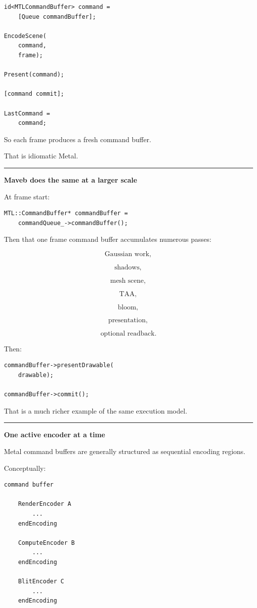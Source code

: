 \begin{verbatim}
id<MTLCommandBuffer> command =
    [Queue commandBuffer];

EncodeScene(
    command,
    frame);

Present(command);

[command commit];

LastCommand =
    command;
\end{verbatim}

So each frame produces a fresh command buffer.

That is idiomatic Metal.

\begin{center}\rule{0.5\linewidth}{0.5pt}\end{center}

\textbf{Maveb does the same at a larger scale}

At frame start:

\begin{verbatim}
MTL::CommandBuffer* commandBuffer =
    commandQueue_->commandBuffer();
\end{verbatim}

Then that one frame command buffer accumulates numerous passes:

\[
\text{Gaussian work},
\]

\[
\text{shadows},
\]

\[
\text{mesh scene},
\]

\[
\text{TAA},
\]

\[
\text{bloom},
\]

\[
\text{presentation},
\]

\[
\text{optional readback}.
\]

Then:

\begin{verbatim}
commandBuffer->presentDrawable(
    drawable);

commandBuffer->commit();
\end{verbatim}

That is a much richer example of the same execution model.

\begin{center}\rule{0.5\linewidth}{0.5pt}\end{center}

\textbf{One active encoder at a time}

Metal command buffers are generally structured as sequential encoding regions.

Conceptually:

\begin{verbatim}
command buffer

    RenderEncoder A
        ...
    endEncoding

    ComputeEncoder B
        ...
    endEncoding

    BlitEncoder C
        ...
    endEncoding
\end{verbatim}

